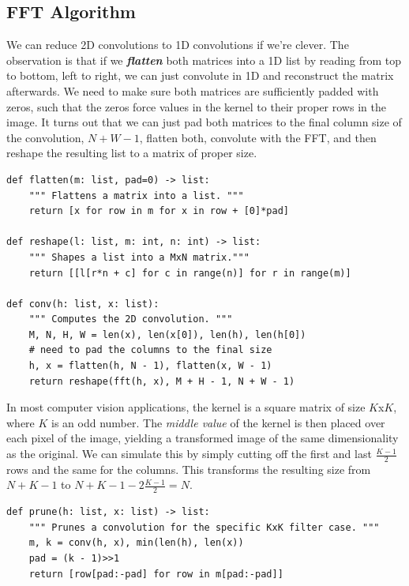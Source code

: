 \documentclass[11pt, oneside]{article}
\newcommand{\emphasis}[1]{\textbf{\textit{#1}}}
\theoremstyle{plain}
\theoremstyle{definition}
\begin{document}
\subsection{FFT Algorithm}

We can reduce 2D convolutions to 1D convolutions if we're clever.
The observation is that if we \emphasis{flatten} both matrices into a 1D list
by reading from top to bottom, left to right, we can just convolute in 1D
and reconstruct the matrix afterwards. We need to make sure both matrices
are sufficiently padded with zeros, such that the zeros force values
in the kernel to their proper rows in the image. It turns out that we can
just pad both matrices to the final column size of the convolution, 
\( N + W - 1 \), flatten both, convolute with the FFT, and then reshape the
resulting list to a matrix of proper size.
\begin{verbatim}
def flatten(m: list, pad=0) -> list:
    """ Flattens a matrix into a list. """
    return [x for row in m for x in row + [0]*pad]

def reshape(l: list, m: int, n: int) -> list:
    """ Shapes a list into a MxN matrix."""
    return [[l[r*n + c] for c in range(n)] for r in range(m)]

def conv(h: list, x: list):
    """ Computes the 2D convolution. """
    M, N, H, W = len(x), len(x[0]), len(h), len(h[0])
    # need to pad the columns to the final size
    h, x = flatten(h, N - 1), flatten(x, W - 1)
    return reshape(fft(h, x), M + H - 1, N + W - 1)
\end{verbatim}
In most computer vision applications, the kernel is a square matrix
of size \( K \)x\( K \), where \( K \) is an odd number.
The \textit{middle value} of the kernel is then placed over each pixel of the
image, yielding a transformed image of the same dimensionality as the original.
We can simulate this by simply cutting off the first and last
\( \frac{K - 1}{2} \) rows and the same for the columns.
This transforms the resulting size from \( N + K - 1 \) to
\( N + K - 1 - 2 \frac{K - 1}{2} = N \).

\begin{verbatim}
def prune(h: list, x: list) -> list:
    """ Prunes a convolution for the specific KxK filter case. """
    m, k = conv(h, x), min(len(h), len(x))
    pad = (k - 1)>>1
    return [row[pad:-pad] for row in m[pad:-pad]]
\end{verbatim}
\end{document}
